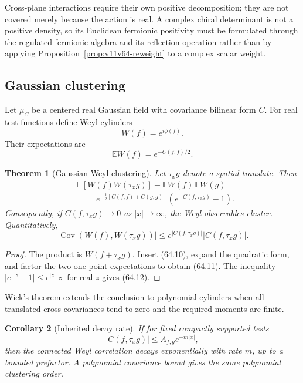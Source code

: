 \documentclass[11pt]{article}
\newtheorem{theorem}{Theorem}[section]
\newtheorem{corollary}[theorem]{Corollary}
\begin{document}
Cross-plane interactions require their own positive decomposition;
they are not covered merely because the action is real.  A complex
chiral determinant is not a positive density, so its Euclidean
fermionic positivity must be formulated through the regulated
fermionic algebra and its reflection operation rather than by applying
Proposition~\ref{prop:v11v64-reweight} to a complex scalar weight.

\subsection{Gaussian clustering}

Let \(\mu_C\) be a centered real Gaussian field with covariance
bilinear form \(C\).  For real test functions define Weyl cylinders
\[
                              W(f)=e^{i\phi(f)}.               \tag{64.9}
\]
Their expectations are
\[
                              {\mathbb E}W(f)
                              =e^{-C(f,f)/2}.                 \tag{64.10}
\]

\begin{theorem}[Gaussian Weyl clustering]
\label{thm:v11v64-gaussian}
Let \(\tau_xg\) denote a spatial translate.  Then
\[
\begin{split}
 &{\mathbb E}[W(f)W(\tau_xg)]
       -{\mathbb E}W(f)\,{\mathbb E}W(g)\\
 &\quad=e^{-\frac12[C(f,f)+C(g,g)]}
             \left(e^{-C(f,\tau_xg)}-1\right).                \tag{64.11}
\end{split}
\]
Consequently, if \(C(f,\tau_xg)\to0\) as \(|x|\to\infty\), the Weyl
observables cluster.  Quantitatively,
\[
 |\operatorname{Cov}(W(f),W(\tau_xg))|
 \le e^{|C(f,\tau_xg)|}|C(f,\tau_xg)|.                       \tag{64.12}
\]
\end{theorem}

\begin{proof}
The product is \(W(f+\tau_xg)\).  Insert (64.10), expand the quadratic
form, and factor the two one-point expectations to obtain (64.11).
The inequality
\(|e^{-z}-1|\le e^{|z|}|z|\) for real \(z\) gives (64.12).
\end{proof}

Wick's theorem extends the conclusion to polynomial cylinders when
all translated cross-covariances tend to zero and the required moments
are finite.

\begin{corollary}[Inherited decay rate]
\label{cor:v11v64-rate}
If for fixed compactly supported tests
\[
 |C(f,\tau_xg)|\le A_{f,g}e^{-m|x|},                         \tag{64.13}
\]
then the connected Weyl correlation decays exponentially with rate
\(m\), up to a bounded prefactor.  A polynomial covariance bound gives
the same polynomial clustering order.
\end{corollary}
\end{document}
